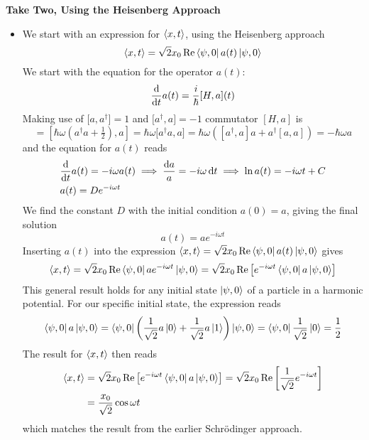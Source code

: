 \documentclass[11pt, a4paper]{article}
\newcommand{\diff}{\mathop{}\!\mathrm{d}} %
\newcommand{\schro}{Schr\"{o}dinger\xspace}
\begin{document}
\textbf{Take Two, Using the Heisenberg Approach}
\begin{itemize}
	\item We start with an expression for $ \ev{x, t} $, using the Heisenberg approach
	\begin{equation*}
		\ev{x, t} = \sqrt{2}x_{0} \Re \bra{\psi, 0}a(t) \ket{\psi, 0}
	\end{equation*}
	We start with the equation for the operator $ a(t) $: 
	\begin{equation*}
		\dv{t}a(t) = \frac{i}{\hbar}[H, a](t)
	\end{equation*}
	Making use of $ \big[a, a^{\dagger}\big] = 1 $ and $ \big[ a^{\dagger}, a\big] = -1 $ commutator $ [H, a] $ is
	\begin{equation*}
		[H, a] = [\hbar \omega (a^{\dagger}a + \tfrac{1}{2}), a] = \hbar \omega \big[a^{\dagger}a, a\big] = \hbar \omega \left([a^{\dagger}, a]a + a^{\dagger}[a, a]\right) = -\hbar \omega a
	\end{equation*}
	and the equation for $ a(t) $ reads
	\begin{align*}
		&\dv{t}a(t) = -i \omega a(t) \implies \frac{\diff a}{a} = -i\omega \diff t \implies \ln a(t) = -i\omega t + C\\
		&a(t) = De^{-i\omega t}
	\end{align*}
	We find the constant $ D $ with the initial condition $ a(0) = a $, giving the final solution 
	\begin{equation*}
		a(t) = ae^{-i\omega t}
	\end{equation*}
	Inserting $ a(t) $ into the expression $ \ev{x, t} = \sqrt{2}x_{0} \Re \bra{\psi, 0}a(t) \ket{\psi, 0} $ gives
	\begin{equation*}
		\ev{x, t} = \sqrt{2}x_{0} \Re \bra{\psi, 0}ae^{-i\omega t} \ket{\psi, 0} = \sqrt{2}x_{0} \Re \left[e^{-i\omega t} \bra{\psi, 0}a \ket{\psi, 0}\right]
	\end{equation*}
	This general result holds for any initial state $ \ket{\psi, 0} $ of a particle in a harmonic potential. For our specific initial state, the expression reads
	\begin{equation*}
		\bra{\psi, 0}a \ket{\psi, 0} = 	\bra{\psi, 0} \left(\frac{1}{\sqrt{2}}a \ket{0} + \frac{1}{\sqrt{2}}a\ket{1} \right) \ket{\psi, 0}  =	\bra{\psi, 0} \frac{1}{\sqrt{2}} \ket{0} = \frac{1}{2}
	\end{equation*}
	The result for $ \ev{x, t} $ then reads
	\begin{align*}
		\ev{x, t} &= \sqrt{2}x_{0} \Re \left[e^{-i\omega t} \bra{\psi, 0}a \ket{\psi, 0}\right] = \sqrt{2}x_{0} \Re \left[\frac{1}{\sqrt{2}} e^{-i\omega t}\right]\\
		&=\frac{x_{0}}{{\sqrt{2}}}\cos \omega t
	\end{align*}
	which matches the result from the earlier \schro approach. 
\end{itemize}
\end{document}
